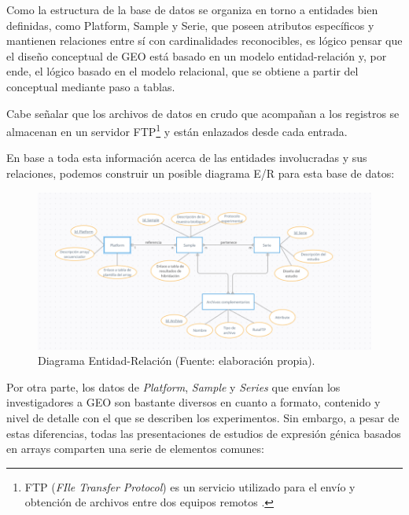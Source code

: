 Como la estructura de la base de datos se organiza en torno a entidades bien definidas, como Platform, Sample y Serie, que poseen atributos específicos
y mantienen relaciones entre sí con cardinalidades reconocibles, es lógico pensar que el diseño conceptual de GEO está basado en un modelo entidad-relación
y, por ende, el lógico basado en el modelo relacional, que se obtiene a partir del conceptual mediante paso a tablas. \newline

Cabe señalar que los archivos de datos en crudo que acompañan a los registros se almacenan en un servidor FTP\footnote{FTP (\textit{FIle Transfer Protocol}) 
es un servicio utilizado para el envío y obtención de archivos entre dos equipos remotos \cite{ftp}.} y están enlazados desde cada entrada. \newline


En base a toda esta información acerca de las entidades involucradas y sus relaciones, podemos construir un posible diagrama E/R para esta base de datos:

\begin{figure}[h]
    \centering
    \includegraphics[width=1\textwidth]{../img/diagramaER.png}
    \caption{Diagrama Entidad-Relación (Fuente: elaboración propia).}
\end{figure}



Por otra parte, los datos de \textit{Platform}, \textit{Sample} y \textit{Series} que envían los investigadores a GEO son bastante diversos en cuanto a formato, 
contenido y nivel de detalle con el que se describen los experimentos. Sin embargo, a pesar de estas diferencias, todas las presentaciones de estudios de expresión 
génica basados en arrays comparten una serie de elementos comunes:

